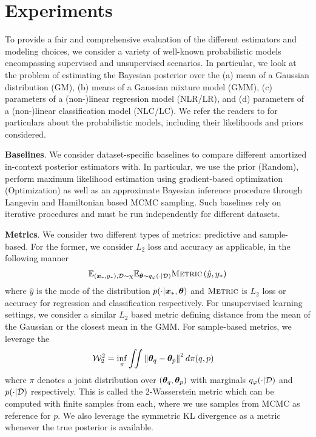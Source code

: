 \vspace{-3mm}
\section{Experiments}
\label{sec:experiments}
\vspace{-1mm}
To provide a fair and comprehensive evaluation of the different estimators and modeling choices, we consider a variety of well-known probabilistic models encompassing supervised and unsupervised scenarios. In particular, we look at the problem of estimating the Bayesian posterior over the (a) mean of a Gaussian distribution (GM), (b) means of a Gaussian mixture model (GMM), (c) parameters of a (non-)linear regression model (NLR/LR), and (d) parameters of a (non-)linear classification model (NLC/LC). We refer the readers to  for particulars about the probabilistic models, including their likelihoods and priors considered.

\textbf{Baselines}. We consider dataset-specific baselines to compare different amortized in-context posterior estimators with. In particular, we use the prior (Random), perform maximum likelihood estimation using gradient-based optimization (Optimization) as well as an approximate Bayesian inference procedure through Langevin and Hamiltonian based MCMC sampling. Such baselines rely on iterative procedures and must be run independently for different datasets.

\textbf{Metrics}. We consider two different types of metrics: predictive and sample-based. For the former, we consider $L_2$ loss and accuracy as applicable, in the following manner
\begin{align}
    \mathbb{E}_{({\bm{x}}_*,y_*), {\mathcal{D}} \sim \chi} \mathbb{E}_{{\bm{\theta}} \sim q_\varphi(\cdot | {\mathcal{D}})}\textsc{Metric}\left(\hat{y}, y_*\right)
\end{align}
where $\hat{y}$ is the mode of the distribution $p(\cdot | {\bm{x}}_*, {\bm{\theta}})$ and $\textsc{Metric}$ is $L_2$ loss or accuracy for regression and classification respectively. For unsupervised learning settings, we consider a similar $L_2$ based metric defining distance from the mean of the Gaussian or the closest mean in the GMM. For sample-based metrics, we leverage the 
\begin{align}
    {\mathcal{W}}_2^2 &= \inf_\pi \iint \left\lVert{\bm{\theta}}_q - {\bm{\theta}}_p\right\rVert^2 d\pi(q, p)
\end{align}
where $\pi$ denotes a joint distribution over $({\bm{\theta}}_q, {\bm{\theta}}_p)$ with marginals $q_\varphi(\cdot | {\mathcal{D}})$ and $p(\cdot | {\mathcal{D}})$ respectively. This is called the 2-Wasserstein metric which can be computed with finite samples from each, where we use samples from MCMC as reference for $p$. We also leverage the symmetric KL divergence as a metric whenever the true posterior is available. 

